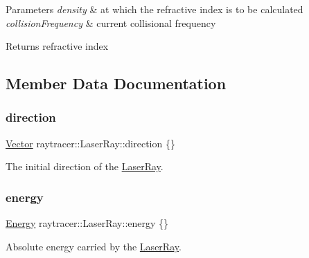 \begin{DoxyParams}{Parameters}
{\em density} & at which the refractive index is to be calculated \\
\hline
{\em collision\+Frequency} & current collisional frequency \\
\hline
\end{DoxyParams}
\begin{DoxyReturn}{Returns}
refractive index 
\end{DoxyReturn}


\subsection{Member Data Documentation}
\mbox{\label{classraytracer_1_1LaserRay_af50d079eead68440a707dfe63b2029d8}} 
\subsubsection{\texorpdfstring{direction}{direction}}
{\footnotesize\ttfamily \hyperlink{classraytracer_1_1Vector}{Vector} raytracer\+::\+Laser\+Ray\+::direction \{\}}



The initial direction of the \hyperlink{classraytracer_1_1LaserRay}{Laser\+Ray}. 

\mbox{\label{classraytracer_1_1LaserRay_a5434b2b8f9c1e5c695761e4c1147b00e}} 
\subsubsection{\texorpdfstring{energy}{energy}}
{\footnotesize\ttfamily \hyperlink{structraytracer_1_1Energy}{Energy} raytracer\+::\+Laser\+Ray\+::energy \{\}}



Absolute energy carried by the \hyperlink{classraytracer_1_1LaserRay}{Laser\+Ray}. 

\mbox{\label{classraytracer_1_1LaserRay_a2f15a3a20e496fdc6308d62d0a520bfd}} 
